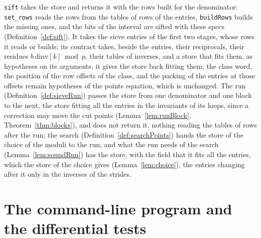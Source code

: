 \verb|sift| takes the store and returns it with the rows built for the denominator: \verb|set_rows|
reads the rows from the tables of rows of the entries, \verb|buildRows| builds the missing ones, and
the bits of the interval are sifted with these specs (Definition~\ref{def:sift}). It takes the sieve
entries of the first two stages, whose rows it reads or builds; its contract takes, beside the
entries, their reciprocals, their residues $b\,\mathrm{dinv}[k] \bmod p$, their tables of inverses,
and a store that fits them, as hypotheses on its arguments; it gives the store back fitting them;
the class word, the position of the row offsets of the class, and the packing of the entries at
those offsets remain hypotheses of the points equation, which is unchanged. The run
(Definition~\ref{def:sieveRun}) passes the store from one denominator and one block to the next,
the store fitting all the entries in the invariants of its loops, since a correction may move the
cut points (Lemma~\ref{lem:runBlock}, Theorem~\ref{thm:blocks}), and does not return it, nothing
reading the tables of rows after the run; the search (Definition~\ref{def:searchPoints}) hands the
store of the choice of the moduli to the run; and what the run needs of the search
(Lemma~\ref{lem:soundRun}) has the store, with the field that it fits all the entries, which the
store of the choice gives (Lemma~\ref{lem:choice}), the entries changing after it only in the
inverses of the strides.

\section{The command-line program and the differential tests}\label{sec:rowsCli}

